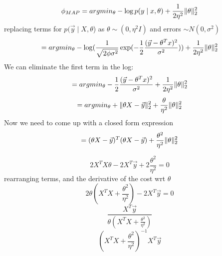 \begin{answer}

\[ \phi_{MAP}= argmin_{\theta} -\log p(y\mid x, \theta) + \frac{1}{2 \eta^2 } \Arrowvert \theta \Arrowvert_2^2 \]
replacing terms for $p(\vec{y}\mid X, \theta$) as  $\theta \sim (0, \eta^2 I)$ and errors $\sim N(0,\sigma^2)$
\[ = argmin_{\theta} - \log(  \frac{1}{ \sqrt{2\phi \sigma^2} } \exp( - \frac{1}{2} \frac{(\vec{y} - \theta^T x)^2}{\sigma^2})) + \frac{1}{2\eta^2} \Arrowvert \theta \Arrowvert_2^2 \]
We can eliminate the first term in the log:
\[ = argmin_{\theta} - \frac{1}{2} \frac{(\vec{y} - \theta^T x)^2}{\sigma^2} +  \frac{1}{2\eta^2} \Arrowvert \theta \Arrowvert_2^2 \]
\[ = argmin_{\theta} +  \Arrowvert \theta X - \vec{y} \Arrowvert_2^2 +  \frac{\theta}{\eta^2} \Arrowvert \theta \Arrowvert_2^2 \]
Now we need to come up with a closed form expression
\[ = (\theta X - \vec{y})^T (\theta X - \vec{y}) + \frac{\theta^2}{\eta^2}\Arrowvert \theta \Arrowvert_2^2 \]

\[ 2 X^T X \theta - 2 X^T \vec{y} + 2 \frac{\theta^2}{\eta^2} = 0 \]
rearranging terms, and the derivative of the cost wrt $\theta$
\[ 2 \theta(X^T X + \frac{\theta^2}{\eta^2}) - 2 X^T \vec{y} = 0\]
\[ \frac{X^T \vec{y}} {\theta(X^T X + \frac{\theta^2}{\eta^2}) }\]
\[ (X^T X + \frac{\theta^2}{\eta^2})^{-1}  X^T \vec{y} \]		

\end{answer}
